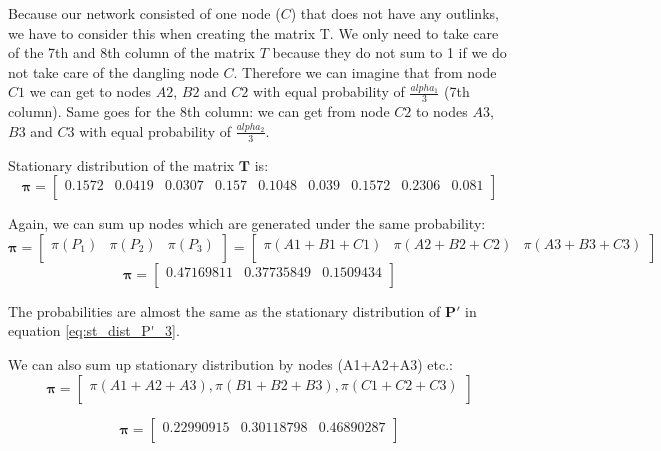 \documentclass{article}
\begin{document}
Because our network consisted of one node ($C$) that does not have any outlinks, we have to consider this when creating the matrix T. We only need to take care of the 7th and 8th column of the matrix $T$ because they do not sum to 1 if we do not take care of the dangling node $C$. Therefore we can imagine that from node $C1$ we can get to nodes $A2$, $B2$ and $C2$ with equal probability of $\frac{alpha_1}{3}$ (7th column). Same goes for the 8th column: we can get from node $C2$ to nodes $A3$, $B3$ and $C3$ with equal probability of $\frac{alpha_2}{3}$.



Stationary distribution of the matrix $\mathbf{T}$ is:
\[\mathbf{\pi} = \begin{bmatrix}
	0.1572 &  0.0419 & 0.0307 & 0.157 &  0.1048 &  0.039 &
  0.1572  & 0.2306 &  0.081\\
	\end{bmatrix}
\]

Again, we can sum up nodes which are generated under the same probability:                   
\[\mathbf{\pi} = 
\begin{bmatrix}
\pi(P_1) & \pi(P_2) & \pi(P_3) \\
\end{bmatrix}
= \begin{bmatrix}
\pi(A1+B1+C1) & \pi(A2 + B2+C2) & \pi(A3 + B3 + C3) \\
\end{bmatrix}
\]
\[\mathbf{\pi} = 
\begin{bmatrix}
0.47169811 & 0.37735849 & 0.1509434\\
\end{bmatrix}
\]

The probabilities are almost the same as the stationary distribution of $\mathbf{P'}$ in equation \ref{eq:st_dist_P'_3}.


We can also sum up stationary distribution by nodes (A1+A2+A3) etc.:
\[\mathbf{\pi} = 
\begin{bmatrix}
\pi(A1+A2+A3), \pi(B1+B2+B3), \pi(C1+C2+C3) \\
\end{bmatrix}
\]


\begin{equation}
\mathbf{\pi} = 
\begin{bmatrix}
0.22990915 & 0.30118798 & 0.46890287 \\
\end{bmatrix}
\label{eq:2_ex}
\end{equation}
\end{document}
